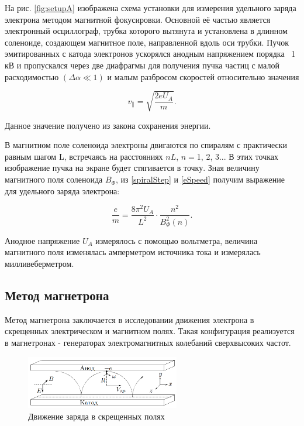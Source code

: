 \documentclass[a4paper,12pt]{article} %
\begin{document}
На рис. \ref{fig:setupA} изображена схема установки для измерения удельного заряда электрона методом магнитной фокусировки. Основной её частью является электронный осциллограф, трубка которого вытянута и установлена в длинном соленоиде, создающем магнитное поле, направленной вдоль оси трубки. Пучок эмитированных с катода электронов ускорялся анодным напряжением порядка ~1 кВ и пропускался через две диафрагмы для получения пучка частиц с малой расходимостью $(\Delta \alpha \ll 1)$ и малым разбросом скоростей относительно значения 

\begin{equation}
    v_\parallel = \sqrt{\frac{2eU_A}{m}}.
    \label{eSpeed}
\end{equation}

Данное значение получено из закона сохранения энергии.

В магнитном поле соленоида электроны двигаются по спиралям с практически равным шагом L, встречаясь на расстояниях $nL$, $n = $1, 2, 3... В этих точках изображение пучка на экране будет стягивается в точку. Зная величину магнитного поля соленоида $B_\Phi$, из \eqref{spiralStep} и \eqref{eSpeed} получим выражение для удельного заряда электрона:

\begin{equation}
    \frac{e}{m} = \frac{8\pi^2 U_A}{L^2} \cdot \frac{n^2}{B_\Phi^2(n)}.
    \label{finalA}
\end{equation}

Анодное напряжение $U_A$ измерялось с помощью вольтметра, величина магнитного поля изменялась амперметром источника тока и измерялась милливеберметром.

\subsection{Метод магнетрона}

Метод магнетрона заключается в исследовании движения электрона в скрещенных электрическом и магнитном полях. Такая конфигурация реализуется в магнетронах - генераторах электромагнитных колебаний сверхвысоких частот.

\begin{figure}
    \centering
    \includegraphics[width = 0.6\textwidth]{electronMovement.png}
    \caption{Движение заряда в скрещенных полях}
    \label{fig:electronMovement}
\end{figure}
\end{document}
